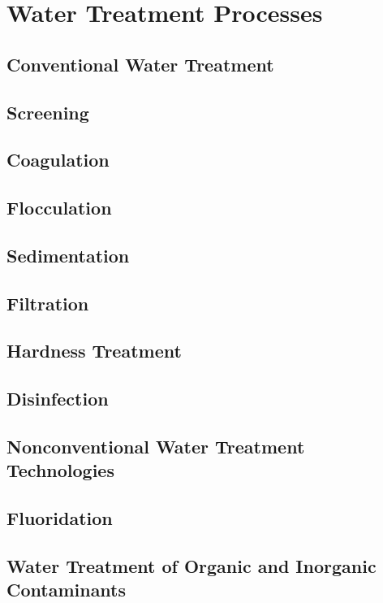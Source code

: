 \section{Water Treatment Processes}
\subsection{Conventional Water Treatment}
\subsection{Screening}
\subsection{Coagulation}
\subsection{Flocculation}
\subsection{Sedimentation}
\subsection{Filtration}
\subsection{Hardness Treatment}
\subsection{Disinfection}
\subsection{Nonconventional Water Treatment Technologies}
\subsection{Fluoridation}
\subsection{Water Treatment of Organic and Inorganic Contaminants}
